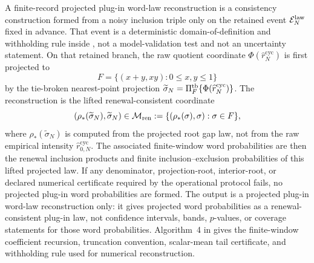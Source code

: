 \begin{definition}\label{def:projected-plugin-word-law-reconstruction-main}
A finite-record projected plug-in word-law reconstruction is a consistency
construction formed from a noisy inclusion triple only on the retained event
\(\mathcal E_N^{\rm law}\) fixed in advance.  That event is a deterministic
domain-of-definition and withholding rule inside
, not a model-validation test and not
an uncertainty statement.  On that retained branch, the raw quotient coordinate
\(\Phi(\widehat r_N^{\mathrm{cyc}})\) is first projected to
\[
F=\{(x+y,xy):0\le x,y\le1\}
\]
by the tie-broken nearest-point projection
\(\widetilde\sigma_N=\Pi_F^{\rm tb}\{\Phi(\widehat r_N^{\mathrm{cyc}})\}\).
The reconstruction is the lifted renewal-consistent coordinate
\[
(\rho_*(\widetilde\sigma_N),\widetilde\sigma_N)\in
\mathcal M_{\rm ren}
:=\{(\rho_*(\sigma),\sigma):\sigma\in F\},
\]
where \(\rho_*(\widetilde\sigma_N)\) is computed from the projected root gap
law, not from the raw empirical intensity
\(\widehat r_{0,N}^{\mathrm{cyc}}\).  The associated finite-window word
probabilities are then the renewal inclusion products and finite
inclusion--exclusion probabilities of this lifted projected law.
If any denominator, projection-root, interior-root, or declared numerical
certificate required by the operational protocol fails, no projected plug-in
word probabilities are formed.  The output is a projected plug-in word-law
reconstruction only: it gives projected word probabilities as a
renewal-consistent plug-in law, not confidence intervals, bands, \(p\)-values,
or coverage statements for those word probabilities.
Algorithm~4 in  gives the finite-window
coefficient recursion, truncation convention, scalar-mean tail certificate,
and withholding rule used for numerical reconstruction.
\end{definition}

